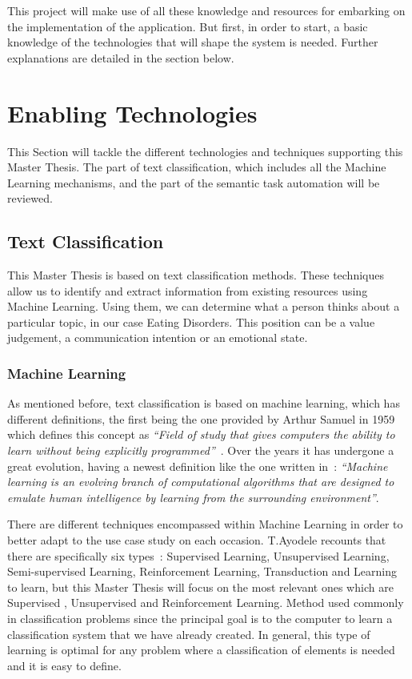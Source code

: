 

This project will make use of all these knowledge and resources for embarking on the implementation of the application. But first, in order to start, a basic knowledge of the technologies that will shape the system is needed. Further explanations are detailed in the section below. 


\section{Enabling Technologies}
This Section will tackle the different technologies and techniques supporting this Master Thesis. The part of text classification, which includes all the Machine Learning mechanisms, and the part of the semantic task automation will be reviewed.


\subsection{Text Classification}
This Master Thesis is based on text classification methods. These techniques allow us to identify and extract information from existing resources using Machine Learning. Using them, we can determine what a person thinks about a particular topic, in our case Eating Disorders. This position can be a value judgement, a communication intention or an emotional state.

\subsubsection{Machine Learning}
As mentioned before, text classification is based on machine learning, which has different definitions, the first being the one provided by Arthur Samuel in 1959 which defines this concept as \textit{``Field of study that gives computers the ability to learn without being explicitly programmed''}~\cite{samuel1959some}.
Over the years it has undergone a great evolution, having a newest definition like the one written in~\cite{el2015machine}: \textit{``Machine learning is an evolving branch of computational algorithms that are designed to emulate human intelligence by learning from the surrounding environment''}.

There are different techniques encompassed within Machine Learning in order to better adapt to the use case study on each occasion. T.Ayodele recounts that there are specifically six types~\cite{ayodele2010types}: Supervised Learning, Unsupervised Learning, Semi-supervised Learning,  Reinforcement Learning, Transduction and Learning to learn, but this Master Thesis will focus on the most relevant ones which are Supervised , Unsupervised and Reinforcement Learning.
Method used commonly in classification problems since the principal goal is to the computer to learn a classification system that we have already created. In general, this type of learning is optimal for any problem where a classification of elements is needed and it is easy to define. 

